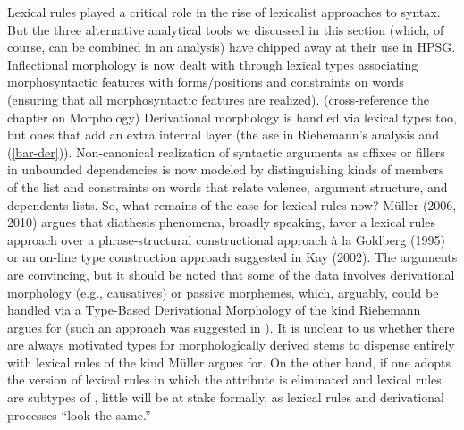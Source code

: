 \documentclass[output=paper]{langsci/langscibook}
\begin{document}
{\begin{exe}
\end{exe}

Lexical rules played a critical role in the rise of lexicalist approaches to syntax. But the three alternative analytical tools we discussed in this section (which, of course, can be combined in an analysis) have chipped away at their use in HPSG. Inflectional morphology is now dealt with through lexical types associating morphosyntactic features with forms/positions and constraints on words (ensuring that all morphosyntactic features are realized). (cross-reference the chapter on Morphology)
Derivational morphology is handled via lexical types too, but ones that add an extra internal layer (the ase in Riehemann's analysis and (\ref{bar-der})). 
Non-canonical realization of syntactic arguments as affixes or fillers in unbounded dependencies is now modeled by distinguishing kinds of members of the  list and constraints on words that relate valence, argument structure, and dependents lists. So, what remains of the case for lexical rules now? Müller (2006, 2010) argues that diathesis phenomena, broadly speaking, favor a lexical rules approach over a phrase-structural constructional approach à la Goldberg (1995) or an on-line type construction approach suggested in Kay (2002). The arguments are convincing, but it should be noted that some of the data involves derivational morphology (e.g., causatives) or passive morphemes, which, arguably, could be handled via a Type-Based Derivational Morphology of the kind Riehemann argues for (such an approach was suggested in \citet[Chapter~4]{Koenig99a}). 
It is unclear to us whether there are always motivated types for morphologically derived stems to dispense entirely with lexical rules of the kind Müller argues for. On the other hand, if one adopts the version of lexical rules in which the  attribute is eliminated and lexical rules are subtypes of , little will be at stake formally, as lexical rules and derivational processes ``look the same.'' 



}
\end{document}
